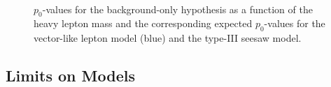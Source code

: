 \begin{figure}[htbp]
	\centering	
	 \\
\caption{$p_0$-values for the background-only hypothesis as a function of the heavy lepton mass and the corresponding expected $p_0$-values for the vector-like lepton model (blue) and the type-III seesaw model. }
\label{fig:resonance-p0value-ss}
\end{figure}


\subsection{Limits on Models}

